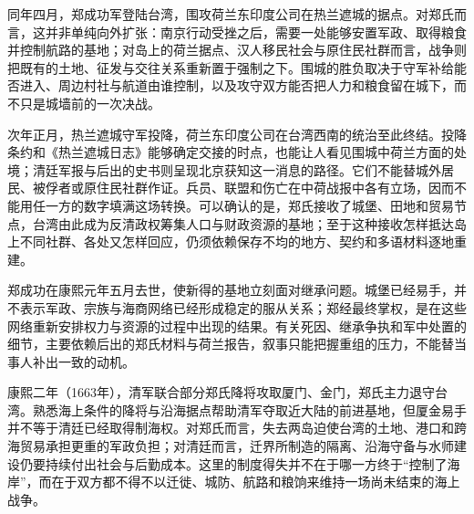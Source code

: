 同年四月，郑成功军登陆台湾，围攻荷兰东印度公司在热兰遮城的据点。对郑氏而言，这并非单纯向外扩张：南京行动受挫之后，需要一处能够安置军政、取得粮食并控制航路的基地；对岛上的荷兰据点、汉人移民社会与原住民社群而言，战争则把既有的土地、征发与交往关系重新置于强制之下。围城的胜负取决于守军补给能否进入、周边村社与航道由谁控制，以及攻守双方能否把人力和粮食留在城下，而不只是城墙前的一次决战。

次年正月，热兰遮城守军投降，荷兰东印度公司在台湾西南的统治至此终结。投降条约和《热兰遮城日志》能够确定交接的时点，也能让人看见围城中荷兰方面的处境；清廷军报与后出的史书则呈现北京获知这一消息的路径。它们不能替城外居民、被俘者或原住民社群作证。兵员、联盟和伤亡在中荷战报中各有立场，因而不能用任一方的数字填满这场转换。可以确认的是，郑氏接收了城堡、田地和贸易节点，台湾由此成为反清政权筹集人口与财政资源的基地；至于这种接收怎样抵达岛上不同社群、各处又怎样回应，仍须依赖保存不均的地方、契约和多语材料逐地重建。

郑成功在康熙元年五月去世，使新得的基地立刻面对继承问题。城堡已经易手，并不表示军政、宗族与海商网络已经形成稳定的服从关系；郑经最终掌权，是在这些网络重新安排权力与资源的过程中出现的结果。有关死因、继承争执和军中处置的细节，主要依赖后出的郑氏材料与荷兰报告，叙事只能把握重组的压力，不能替当事人补出一致的动机。

康熙二年（1663年），清军联合部分郑氏降将攻取厦门、金门，郑氏主力退守台湾。熟悉海上条件的降将与沿海据点帮助清军夺取近大陆的前进基地，但厦金易手并不等于清廷已经取得制海权。对郑氏而言，失去两岛迫使台湾的土地、港口和跨海贸易承担更重的军政负担；对清廷而言，迁界所制造的隔离、沿海守备与水师建设仍要持续付出社会与后勤成本。这里的制度得失并不在于哪一方终于“控制了海岸”，而在于双方都不得不以迁徙、城防、航路和粮饷来维持一场尚未结束的海上战争。
